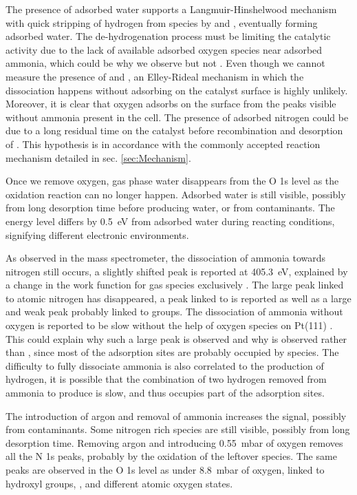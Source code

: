 The presence of adsorbed water supports a Langmuir-Hinshelwood mechanism with quick stripping of hydrogen from  species by  and , eventually forming adsorbed water.
The de-hydrogenation process must be limiting the catalytic activity due to the lack of available adsorbed oxygen species near adsorbed ammonia, which could be why we observe  but not .
Even though we cannot measure the presence of  and , an Elley-Rideal mechanism in which the  dissociation happens without adsorbing on the catalyst surface is highly unlikely.
Moreover, it is clear that oxygen adsorbs on the surface from the peaks visible without ammonia present in the cell.
The presence of adsorbed nitrogen could be due to a long residual time on the catalyst before recombination and desorption of .
This hypothesis is in accordance with the commonly accepted reaction mechanism detailed in sec. \ref{sec:Mechanism}.

Once we remove oxygen, gas phase water disappears from the O 1s level as the oxidation reaction can no longer happen.
Adsorbed water is still visible, possibly from long desorption time before producing water, or from contaminants.
The energy level differs by \qty{0.5}{\eV} from adsorbed water during reacting conditions, signifying different electronic environments.

As observed in the mass spectrometer, the dissociation of ammonia towards nitrogen still occurs, a slightly shifted  peak is reported at \qty{405.3}{\eV}, explained by a change in the work function for gas species exclusively \parencite{Starr2021}.
The large peak linked to atomic nitrogen has disappeared, a peak linked to  is reported as well as a large and weak peak probably linked to  groups.
The dissociation of ammonia without oxygen is reported to be slow without the help of oxygen species on Pt(111) \parencite{Offermans2006,Offermans2007, Imbihl2007, NovellLeruth2008}.
This could explain why such a large peak is observed and why  is observed rather than , since most of the adsorption sites are probably occupied by  species.
The difficulty to fully dissociate ammonia is also correlated to the production of hydrogen, it is possible that the combination of two hydrogen removed from ammonia to produce  is slow, and thus occupies part of the adsorption sites.

The introduction of argon and removal of ammonia increases the  signal, possibly from contaminants.
Some nitrogen rich species are still visible, possibly from long desorption time.
Removing argon and introducing \qty{0.55}{\milli\bar} of oxygen removes all the N 1s peaks, probably by the oxidation of the leftover  species.
The same peaks are observed in the O 1s level as under \qty{8.8}{\milli\bar} of oxygen, linked to hydroxyl groups, , and different atomic oxygen states.

